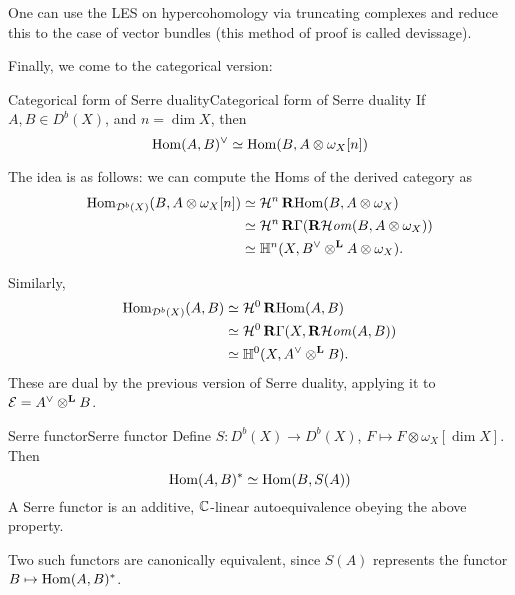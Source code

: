 One can use the LES on hypercohomology via truncating complexes and reduce this to the case of vector bundles (this method of proof is called devissage).

Finally, we come to the categorical version:

\begin{proposition}{Categorical form of Serre duality}{Categorical form of Serre duality}
    If $A,B\in D^b(X)$, and $n=\dim X$, then
    \begin{equation*}
        \operatorname{Hom}(A,B)^\vee \simeq \operatorname{Hom}(B,A\otimes\omega_X[n])
    \end{equation*}
\end{proposition}

The idea is as follows: we can compute the Homs of the derived category as
\begin{align*}
    \operatorname{Hom}_{\mathcal{D}^b(X)}(B,A\otimes\omega_X[n])
        &\simeq \mathcal{H}^n\operatorname{\mathbf{R} Hom}(B,A\otimes\omega_X) \\
        &\simeq \mathcal{H}^n\operatorname{\mathbf{R}\Gamma}(\operatorname{\mathbf{R}\mathcal{H}\mathit{om}}(B,A\otimes\omega_X)) \\
        &\simeq \mathbb{H}^n(X,B^\vee\otimes^{\mathbf{L}} A\otimes\omega_X).
\end{align*}

Similarly,
\begin{align*}
    \operatorname{Hom}_{\mathcal{D}^b(X)}(A,B)
        &\simeq \mathcal{H}^0\operatorname{\mathbf{R} Hom}(A,B) \\
        &\simeq \mathcal{H}^0\operatorname{\mathbf{R}\Gamma}(X,\operatorname{\mathbf{R}\mathcal{H}\mathit{om}}(A,B)) \\
        &\simeq \mathbb{H}^0(X,A^\vee\otimes^{\mathbf{L}} B).
\end{align*}
These are dual by the previous version of Serre duality, applying it to $\mathcal{E}=A^\vee\otimes^{\mathbf{L}} B$.

\begin{definition}{Serre functor}{Serre functor}
    Define $S:D^b(X)\to D^b(X)$, $F\mapsto F\otimes\omega_X[\dim X]$. Then
    \begin{equation*}
        \operatorname{Hom}(A,B)^*\simeq\operatorname{Hom}(B,S(A))
    \end{equation*}
     A Serre functor is an additive, $\mathbb{C}$-linear autoequivalence obeying the above property.
\end{definition}

Two such functors are canonically equivalent, since $S(A)$ represents the functor $B\mapsto\operatorname{Hom}(A,B)^*$.


